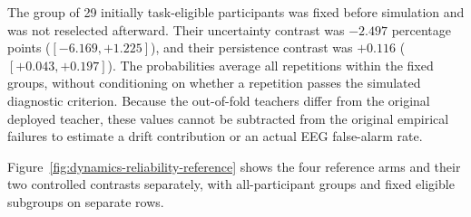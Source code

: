 \documentclass[11pt,a4paper]{article}
\begin{document}
The group of 29 initially task-eligible participants was fixed before simulation and was not reselected afterward. Their uncertainty contrast was $-2.497$ percentage points ($[-6.169,+1.225]$), and their persistence contrast was $+0.116$ ($[+0.043,+0.197]$). The probabilities average all repetitions within the fixed groups, without conditioning on whether a repetition passes the simulated diagnostic criterion. Because the out-of-fold teachers differ from the original deployed teacher, these values cannot be subtracted from the original empirical failures to estimate a drift contribution or an actual EEG false-alarm rate.

Figure~\ref{fig:dynamics-reliability-reference} shows the four reference arms and their two controlled contrasts separately, with all-participant groups and fixed eligible subgroups on separate rows.
\end{document}

